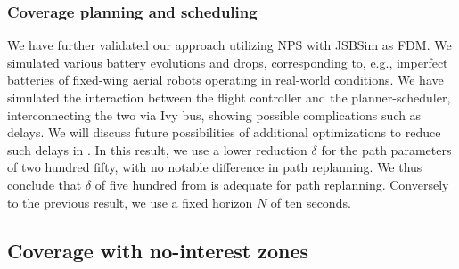 \subsubsection*{Coverage planning and scheduling}

We have further validated our approach utilizing NPS with JSBSim as FDM. We simulated various battery evolutions and drops, corresponding to, e.g., imperfect batteries of fixed-wing aerial robots operating in real-world conditions. We have simulated the interaction between the flight controller and the planner-scheduler, interconnecting the two via Ivy bus, showing possible complications such as delays. We will discuss future possibilities of additional optimizations to reduce such delays in . In this result, we use a lower reduction $\delta$ for the path parameters of two hundred fifty, with no notable difference in path replanning. We thus conclude that $\delta$ of five hundred from  is adequate for path replanning. Conversely to the previous result, we use a fixed horizon $N$ of ten seconds.

\subsection{Coverage with no-interest zones}
\label{sec:res-obsta}

